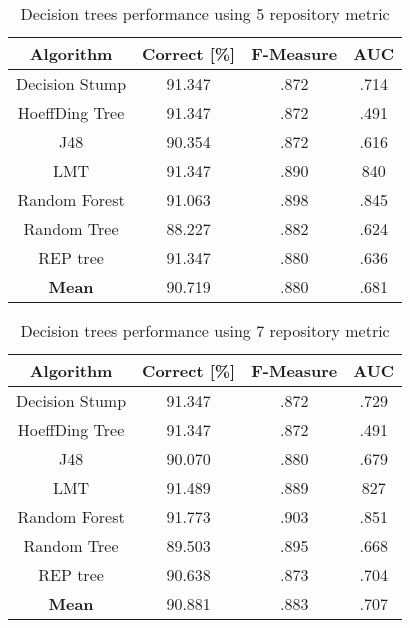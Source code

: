 \begin{table}[h!]		
\centering		
\begin{tabular}{ |c|c|c|c| } 		
 \hline		
 \textbf{Algorithm} & \textbf{Correct [\%]} & \textbf{F-Measure} & \textbf{AUC}  \\ 		
 \hline		
 Decision Stump & 91.347 & .872 & .714    \\ 		
 \hline		
 HoeffDing Tree &  91.347 & .872 & .491   \\ 		
 \hline		
  J48 & 90.354 & .872 & .616\\ 		
 \hline		
  LMT & 91.347 & .890 & 840  \\ 		
 \hline		
  Random Forest & 91.063 & .898 & .845 \\ 		
 \hline		
  Random Tree & 88.227 & .882 & .624 \\ 		
 \hline		
 REP tree  & 91.347 & .880 & .636 \\ 		
 \hline	
 \textbf{Mean}  & 90.719 & .880 & .681 \\ 		
 \hline	
		
\end{tabular}		
\caption{Decision trees performance using 5 repository metric}		
\label{table:DT_5}		
\end{table}

\begin{table}[h!]		
\centering		
\begin{tabular}{ |c|c|c|c| } 		
 \hline		
 \textbf{Algorithm} & \textbf{Correct [\%]} & \textbf{F-Measure} & \textbf{AUC}  \\ 		
 \hline		
 Decision Stump & 91.347 & .872 & .729    \\ 		
 \hline		
 HoeffDing Tree &  91.347 & .872 & .491   \\ 		
 \hline		
  J48 & 90.070 & .880 & .679\\ 		
 \hline		
  LMT & 91.489 & .889 & 827  \\ 		
 \hline		
  Random Forest & 91.773 & .903 & .851 \\ 		
 \hline		
  Random Tree & 89.503 & .895 & .668 \\ 		
 \hline		
 REP tree  & 90.638 & .873 & .704 \\ 		
 \hline		
 \textbf{Mean}  & 90.881 & .883 & .707 \\ 		
 \hline
		
\end{tabular}		
\caption{Decision trees performance using 7 repository metric}		
\label{table:DT_7}		
\end{table}